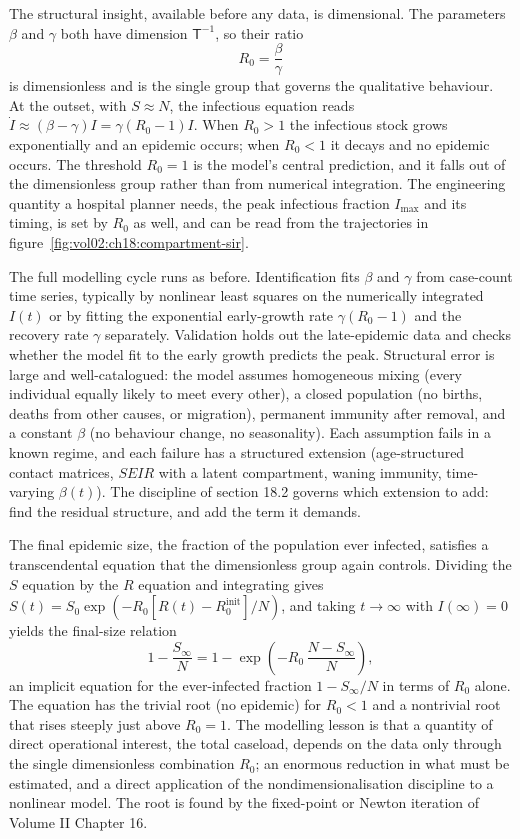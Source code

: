 The structural insight, available before any data, is dimensional. The
parameters $\beta$ and $\gamma$ both have dimension
$\mathsf{T}^{-1}$, so their ratio
\[
R_0 = \frac{\beta}{\gamma}
\]
is dimensionless and is the single group that governs the qualitative
behaviour. At the outset, with $S \approx N$, the infectious equation
reads $\dot I \approx (\beta - \gamma) I = \gamma(R_0 - 1) I$. When
$R_0 > 1$ the infectious stock grows exponentially and an epidemic
occurs; when $R_0 < 1$ it decays and no epidemic occurs. The threshold
$R_0 = 1$ is the model's central prediction, and it falls out of the
dimensionless group rather than from numerical integration. The
engineering quantity a hospital planner needs, the peak infectious
fraction $I_{\max}$ and its timing, is set by $R_0$ as well, and can be
read from the trajectories in
figure~\ref{fig:vol02:ch18:compartment-sir}.



The full modelling cycle runs as before. Identification fits $\beta$ and
$\gamma$ from case-count time series, typically by nonlinear least
squares on the numerically integrated $I(t)$ or by fitting the
exponential early-growth rate $\gamma(R_0 - 1)$ and the recovery rate
$\gamma$ separately. Validation holds out the late-epidemic data and
checks whether the model fit to the early growth predicts the peak.
Structural error is large and well-catalogued: the model assumes
homogeneous mixing (every individual equally likely to meet every
other), a closed population (no births, deaths from other causes, or
migration), permanent immunity after removal, and a constant $\beta$
(no behaviour change, no seasonality). Each assumption fails in a known
regime, and each failure has a structured extension (age-structured
contact matrices, $SEIR$ with a latent compartment, waning immunity,
time-varying $\beta(t)$). The discipline of section 18.2 governs which
extension to add: find the residual structure, and add the term it
demands.

\begin{mastery}
The final epidemic size, the fraction of the population ever infected,
satisfies a transcendental equation that the dimensionless group again
controls. Dividing the $S$ equation by the $R$ equation and integrating
gives $S(t) = S_0 \exp(-R_0 [R(t) - R_0^{\text{init}}]/N)$, and taking
$t \to \infty$ with $I(\infty) = 0$ yields the final-size relation
\[
1 - \frac{S_\infty}{N} = 1 - \exp\!\left(-R_0\, \frac{N - S_\infty}{N}\right),
\]
an implicit equation for the ever-infected fraction $1 - S_\infty/N$ in
terms of $R_0$ alone. The equation has the trivial root (no epidemic)
for $R_0 < 1$ and a nontrivial root that rises steeply just above
$R_0 = 1$. The modelling lesson is that a quantity of direct
operational interest, the total caseload, depends on the data only
through the single dimensionless combination $R_0$; an enormous
reduction in what must be estimated, and a direct application of the
nondimensionalisation discipline to a nonlinear model. The
root is found by the fixed-point or Newton iteration of Volume II
Chapter 16.
\end{mastery}

